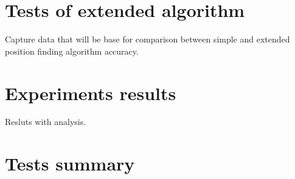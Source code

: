 \documentclass[../main.tex]{subfiles}
\begin{document}
\section{Tests of extended algorithm} %
\label{sec:tests_of_extended_algorithm}

Capture data that will be base for comparison between simple and extended position finding algorithm accuracy.


\section{Experiments results} %
\label{sec:experiments_results}

Resluts with analysis.


\section{Tests summary} %
\label{sec:tests_summary}

\end{document}
